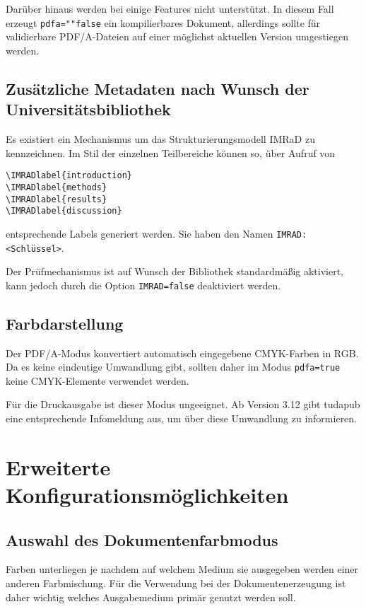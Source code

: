 \documentclass[
	german,%
	accentcolor=9c,%
]{tudapub}
\newcommand*{\code}[1]{\texttt{#1}}
\newcommand*{\cls}[1]{\textsf{#1}}
\begin{document}
Darüber hinaus werden bei  einige Features nicht unterstützt. In diesem Fall erzeugt \code{pdfa=""false} ein kompilierbares Dokument, allerdings sollte für validierbare PDF/A-Dateien auf  einer möglichst aktuellen Version umgestiegen werden.

\subsection{Zusätzliche Metadaten nach Wunsch der Universitätsbibliothek}
\label{sec:IMRAD}
Es existiert ein Mechanismus um das Strukturierungsmodell IMRaD \cite{imrad} zu kennzeichnen.
Im Stil der einzelnen Teilbereiche können so, über Aufruf von

\begin{verbatim}
\IMRADlabel{introduction}
\IMRADlabel{methods}
\IMRADlabel{results}
\IMRADlabel{discussion}
\end{verbatim}
entsprechende Labels generiert werden. Sie haben den Namen \code{IMRAD:<Schlüssel>}.

Der Prüfmechanismus ist auf Wunsch der Bibliothek standardmäßig aktiviert, kann jedoch durch die Option \code{IMRAD=false} deaktiviert werden.

\subsection{Farbdarstellung}
\label{sec:pdfa-color}
Der PDF/A-Modus konvertiert automatisch eingegebene CMYK-Farben in RGB. Da es keine eindeutige Umwandlung gibt, sollten daher im Modus \code{pdfa=true} keine CMYK-Elemente verwendet werden.

Für die Druckausgabe ist dieser Modus ungeeignet. Ab Version 3.12 gibt \cls{tudapub} eine entsprechende Infomeldung aus, um über diese Umwandlung zu informieren.

\section{Erweiterte Konfigurationsmöglichkeiten}

\subsection{Auswahl des Dokumentenfarbmodus}
Farben unterliegen je nachdem auf welchem Medium sie ausgegeben werden einer anderen Farbmischung. Für die Verwendung bei der Dokumentenerzeugung ist daher wichtig welches Ausgabemedium primär genutzt werden soll.
\end{document}
